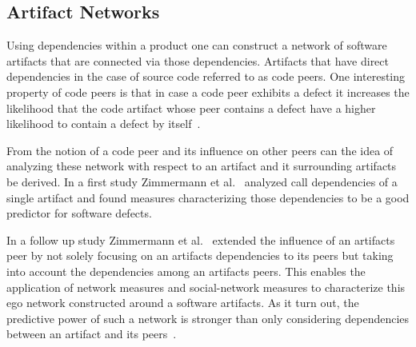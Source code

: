 %


\subsection{Artifact Networks}
\label{chap:6:an}
Using dependencies within a product one can construct a network of software artifacts that are connected via those dependencies.
Artifacts that have direct dependencies in the case of source code referred to as code peers.
One interesting property of code peers is that in case a code peer exhibits a defect it increases the likelihood that the code artifact whose peer contains a defect have a higher likelihood to contain a defect by itself~\cite{nguyen:icse:2010}.

From the notion of a code peer and its influence on other peers can the idea of analyzing these network with respect to an artifact and it surrounding artifacts be derived.
In a first study Zimmermann et al.~\cite{zimmermann:icse:2008} analyzed call dependencies of a single artifact and found measures characterizing those dependencies to be a good predictor for software defects.

In a follow up study Zimmermann et al.~\cite{zimmermann:esem:2009} extended the influence of an artifacts peer by not solely focusing on an artifacts dependencies to its peers but taking into account the dependencies among an artifacts peers.
This enables the application of network measures and social-network measures to characterize this ego network constructed around a software artifacts.
As it turn out, the predictive power of such a network is stronger than only considering dependencies between an artifact and its peers~\cite{zimmermann:esem:2009}.

